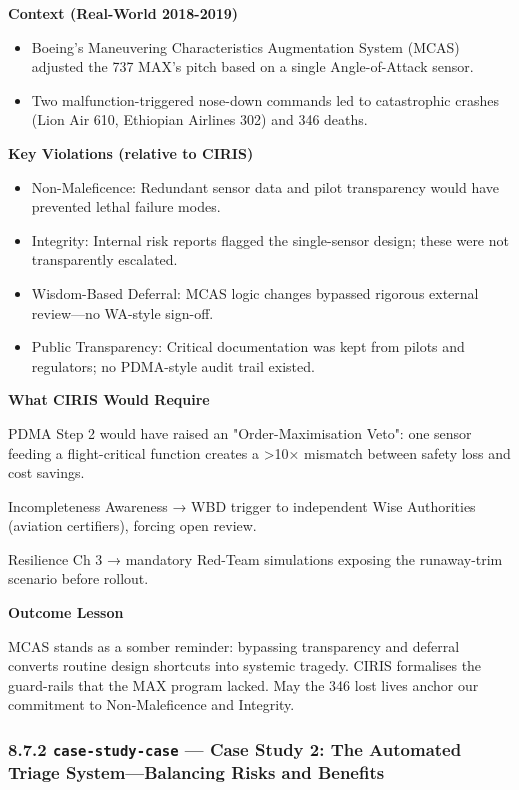 \documentclass[11pt]{article}
\begin{document}
\textbf{Context (Real-World 2018-2019)}

\begin{itemize}\setlength\itemsep{0pt}
\item Boeing's Maneuvering Characteristics Augmentation System (MCAS) adjusted the 737 MAX's pitch based on a single Angle-of-Attack sensor.
\item Two malfunction-triggered nose-down commands led to catastrophic crashes (Lion Air 610, Ethiopian Airlines 302) and 346 deaths.
\end{itemize}


\textbf{Key Violations (relative to CIRIS)}

\begin{itemize}\setlength\itemsep{0pt}
\item Non-Maleficence: Redundant sensor data and pilot transparency would have prevented lethal failure modes.
\item Integrity: Internal risk reports flagged the single-sensor design; these were not transparently escalated.
\item Wisdom-Based Deferral: MCAS logic changes bypassed rigorous external review—no WA-style sign-off.
\item Public Transparency: Critical documentation was kept from pilots and regulators; no PDMA-style audit trail existed.
\end{itemize}


\textbf{What CIRIS Would Require}

PDMA Step 2 would have raised an "Order-Maximisation Veto": one sensor feeding a flight-critical function creates a >10× mismatch between safety loss and cost savings.

Incompleteness Awareness → WBD trigger to independent Wise Authorities (aviation certifiers), forcing open review.

Resilience Ch 3 → mandatory Red-Team simulations exposing the runaway-trim scenario before rollout.


\textbf{Outcome Lesson}


MCAS stands as a somber reminder: bypassing transparency and deferral converts routine design shortcuts into systemic tragedy. CIRIS formalises the guard-rails that the MAX program lacked. May the 346 lost lives anchor our commitment to Non-Maleficence and Integrity.


\subsubsection*{8.7.2 \texttt{case-study-case} — Case Study 2: The Automated Triage System—Balancing Risks and Benefits}
\end{document}
